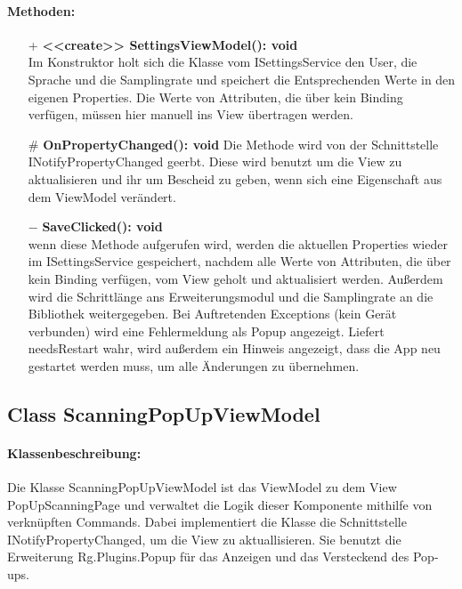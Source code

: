 \documentclass[a4paper,12pt]{article}
\begin{document}
\paragraph{Methoden:}
\begin{itemize}
    \item[+] \textbf{<<create>> SettingsViewModel(): void}\\ Im Konstruktor holt sich die Klasse vom ISettingsService den User, die Sprache und die Samplingrate und speichert die Entsprechenden Werte in den eigenen Properties. Die Werte von Attributen, die über kein Binding verfügen, müssen hier manuell ins View übertragen werden.
    \item[\#] \textbf{OnPropertyChanged(): void} Die Methode wird von der Schnittstelle INotifyPropertyChanged geerbt. Diese wird benutzt um die View zu aktualisieren und ihr um Bescheid zu geben, wenn sich eine Eigenschaft aus dem ViewModel verändert. 
    \item[$-$] \textbf{SaveClicked(): void}\\ wenn diese Methode aufgerufen wird, werden die aktuellen Properties wieder im ISettingsService gespeichert, nachdem alle Werte von Attributen, die über kein Binding verfügen, vom View geholt und aktualisiert werden. Außerdem wird die Schrittlänge ans Erweiterungsmodul und die Samplingrate an die Bibliothek weitergegeben. Bei Auftretenden Exceptions (kein Gerät verbunden) wird eine Fehlermeldung als Popup angezeigt. Liefert needsRestart wahr, wird außerdem ein Hinweis angezeigt, dass die App neu gestartet werden muss, um alle Änderungen zu übernehmen. 
\end{itemize} 

\subsection{Class ScanningPopUpViewModel}
	\paragraph{Klassenbeschreibung:}
	Die Klasse ScanningPopUpViewModel ist das ViewModel zu dem View PopUpScanningPage und verwaltet die Logik dieser Komponente mithilfe von verknüpften Commands. Dabei implementiert die Klasse die Schnittstelle INotifyPropertyChanged, um die View zu aktuallisieren.
	Sie benutzt die Erweiterung \Gls{Rg.Plugins.Popup} für das Anzeigen und das Versteckend des Pop-ups.
	
\end{document}
